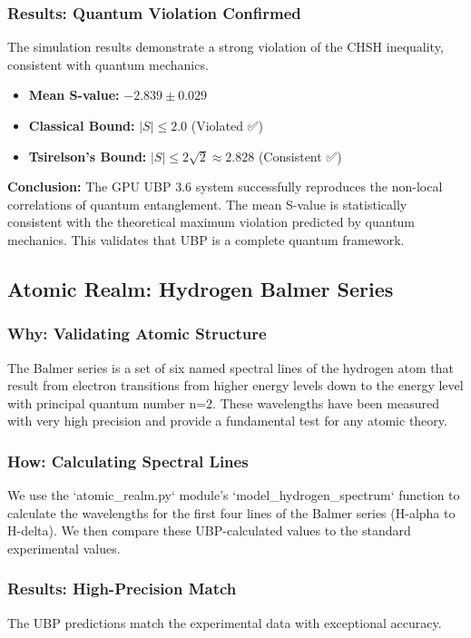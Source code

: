 \documentclass[12pt, a4paper]{article}
\begin{document}
\subsubsection{Results: Quantum Violation Confirmed}
The simulation results demonstrate a strong violation of the CHSH inequality, consistent with quantum mechanics.
\begin{itemize}
    \item \textbf{Mean S-value:} $-2.839 \pm 0.029$
    \item \textbf{Classical Bound:} $|S| \leq 2.0$ (Violated ✅)
    \item \textbf{Tsirelson's Bound:} $|S| \leq 2\sqrt{2} \approx 2.828$ (Consistent ✅)
\end{itemize}
\textbf{Conclusion:} The GPU UBP 3.6 system successfully reproduces the non-local correlations of quantum entanglement. The mean S-value is statistically consistent with the theoretical maximum violation predicted by quantum mechanics. This validates that UBP is a complete quantum framework.

\subsection{Atomic Realm: Hydrogen Balmer Series}

\subsubsection{Why: Validating Atomic Structure}
The Balmer series is a set of six named spectral lines of the hydrogen atom that result from electron transitions from higher energy levels down to the energy level with principal quantum number n=2. These wavelengths have been measured with very high precision and provide a fundamental test for any atomic theory.

\subsubsection{How: Calculating Spectral Lines}
We use the `atomic\_realm.py` module's `model\_hydrogen\_spectrum` function to calculate the wavelengths for the first four lines of the Balmer series (H-alpha to H-delta). We then compare these UBP-calculated values to the standard experimental values.

\subsubsection{Results: High-Precision Match}
The UBP predictions match the experimental data with exceptional accuracy.
\end{document}
